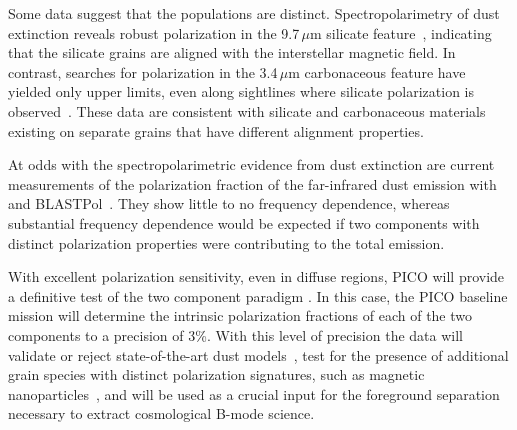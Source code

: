\documentclass[PICOReport.tex]{subfiles}
\begin{document}

Some data suggest that the populations are distinct. Spectropolarimetry of dust extinction reveals robust polarization in the 9.7\,$\mu$m silicate feature~\citep[e.g.,][]{Smith2000}, indicating that the silicate grains are aligned with the interstellar magnetic field. In contrast, searches for polarization in the 3.4\,$\mu$m carbonaceous feature have yielded only upper limits, even along sightlines where silicate polarization is observed~\citep{Chiar2006,Mason2007}. These data are consistent with silicate and carbonaceous materials existing on separate grains that have different alignment properties. 

At odds with the spectropolarimetric evidence from dust extinction are current measurements of the polarization fraction of the far-infrared dust emission with \planck~\citep{Planck_Int_XXII} and BLASTPol~\citep{Ashton2018}. They show little to no frequency dependence, whereas substantial frequency dependence would be expected if two components with distinct polarization properties were contributing to the total emission. 

With excellent polarization sensitivity, even in diffuse regions, PICO will provide a definitive test of the two component paradigm \citep{Meisner2015}. 
In this case, the PICO baseline mission will determine the intrinsic polarization fractions of each of the two components to a precision of 3\%. With this level of precision the data will validate or reject state-of-the-art dust models~\citep[e.g.][Hensley \& Draine, in prep]{Guillet2018}, test for the presence of additional grain species with distinct polarization signatures, such as magnetic nanoparticles~\citep{Draine2013}, and will be used as a crucial input for the foreground separation necessary to extract cosmological B-mode science. 
\end{document}
